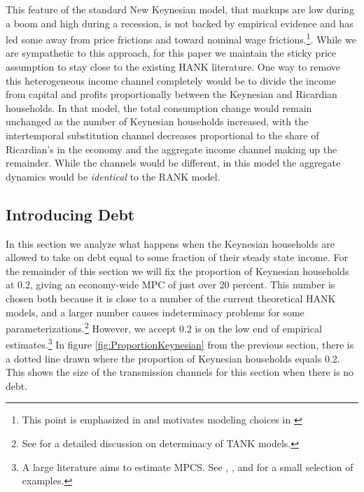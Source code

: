 \documentclass[titlepage]{\econtex}\newcommand{\texname}{ConsumptionHeterogeneity}
\begin{document}
This feature of the standard New Keynesian model, that markups are low during a boom and high during a recession, is not backed by empirical evidence and has led some away from price frictions and toward nominal wage frictions.\footnote{This point is emphasized in \cite{broer_2018} and motivates modeling choices in \cite{auclert_inequality_2018}}. While we are sympathetic to this approach, for this paper we maintain the sticky price assumption to stay close to the existing HANK literature. One way to remove this heterogeneous income channel completely would be to divide the income from capital and profits proportionally between the Keynesian and Ricardian households. In that model, the total consumption change would remain unchanged as the number of Keynesian households increased, with the intertemporal substitution channel decreases proportional to the share of Ricardian's in the economy and the aggregate income channel making up the remainder. While the channels would be different, in this model the aggregate dynamics would be \textit{identical} to the RANK model.

\subsection{Introducing Debt}
In this section we analyze what happens when the Keynesian households are allowed to take on debt equal to some fraction of their steady state income. For the remainder of this section we will fix the proportion of Keynesian households at 0.2, giving an economy-wide MPC of just over 20 percent. This number is chosen both because it is close to a number of the current theoretical HANK models, and a larger number causes indeterminacy problems for some parameterizations.\footnote{See \cite{gali_2004} for a detailed discussion on determinacy of TANK models.} However, we accept 0.2 is on the low end of empirical estimates.\footnote{A large literature aims to estimate MPCS. See \cite{johnson_household_2006}, \cite{parker_consumer_2013}, \cite{fagereng_mpc_2016} and \cite{ckConsumption} for a small selection of examples.} In figure \ref{fig:ProportionKeynesian} from the previous section, there is a dotted line drawn where the proportion of Keynesian households equals 0.2. This shows the size of the transmission channels for this section when there is no debt.
\end{document}
